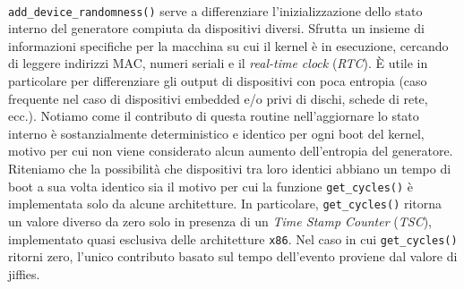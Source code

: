 \documentclass{article}
\begin{document}
 \paragraph{}\verb+add_device_randomness()+ serve a differenziare 
 l'inizializzazione dello stato interno del generatore compiuta da dispositivi
 diversi. Sfrutta un insieme di informazioni specifiche per la macchina su cui
 il kernel è in esecuzione, cercando di leggere indirizzi MAC, numeri seriali e
 il \emph{real-time clock} (\emph{RTC}). 
 È utile in particolare per differenziare gli output di dispositivi con poca
 entropia (caso frequente nel caso di dispositivi embedded e/o privi di dischi, 
 schede di rete, ecc.). 
 \newline Notiamo come il contributo di questa routine nell'aggiornare lo
 stato interno è sostanzialmente deterministico e identico per ogni boot del kernel,
 motivo per cui non viene considerato alcun aumento dell'entropia del
 generatore. \newline
 Riteniamo che la possibilità che dispositivi tra loro identici abbiano un tempo
 di boot a sua volta identico sia il motivo per cui la funzione
 \verb+get_cycles()+ è implementata solo da alcune architetture.
 In particolare, \verb+get_cycles()+ ritorna un valore diverso da zero solo in
 presenza di un \emph{Time Stamp Counter} (\emph{TSC}), implementato
 quasi esclusiva delle architetture \verb+x86+. Nel caso in cui
 \verb+get_cycles()+ ritorni zero, l'unico contributo basato sul tempo
 dell'evento proviene dal valore di jiffies.
 
 
\end{document}
